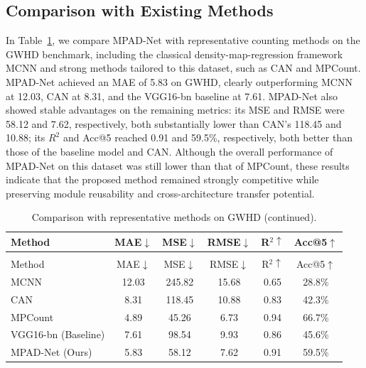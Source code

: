 \documentclass[a4paper,fleqn]{cas-sc}
\begin{document}
	\FloatBarrier
	
	\subsection{Comparison with Existing Methods}
	
	In Table~\ref{tab:sota_gwhd}, we compare MPAD-Net with representative counting methods on the GWHD benchmark, including the classical density-map-regression framework MCNN and strong methods tailored to this dataset, such as CAN and MPCount. MPAD-Net achieved an MAE of 5.83 on GWHD, clearly outperforming MCNN at 12.03, CAN at 8.31, and the VGG16-bn baseline at 7.61. MPAD-Net also showed stable advantages on the remaining metrics: its MSE and RMSE were 58.12 and 7.62, respectively, both substantially lower than CAN's 118.45 and 10.88; its $R^2$ and Acc@5 reached 0.91 and 59.5\%, respectively, both better than those of the baseline model and CAN. Although the overall performance of MPAD-Net on this dataset was still lower than that of MPCount, these results indicate that the proposed method remained strongly competitive while preserving module reusability and cross-architecture transfer potential.
	
	\begin{longtable}{lccccc}
		\caption{Comparison with representative methods on GWHD.}
		\label{tab:sota_gwhd}\\
		\hline
		Method & MAE$\downarrow$ & MSE$\downarrow$ & RMSE$\downarrow$ & R$^2\uparrow$ & Acc@5$\uparrow$ \\
		\hline
		\endfirsthead
		\caption[]{Comparison with representative methods on GWHD (continued).}\\
		\hline
		Method & MAE$\downarrow$ & MSE$\downarrow$ & RMSE$\downarrow$ & R$^2\uparrow$ & Acc@5$\uparrow$ \\
		\hline
		\endhead
		\hline
		\endfoot
		\hline
		\endlastfoot
		MCNN \cite{ref20}      & 12.03 & 245.82 & 15.68 & 0.65 & 28.8\% \\
		CAN \cite{ref23}       & 8.31  & 118.45 & 10.88 & 0.83 & 42.3\% \\
		MPCount \cite{ref58}   & 4.89  & 45.26  & 6.73  & 0.94 & 66.7\% \\
		VGG16-bn (Baseline)    & 7.61  & 98.54  & 9.93  & 0.86 & 45.6\% \\
		MPAD-Net (Ours)        & 5.83  & 58.12  & 7.62  & 0.91 & 59.5\% \\
	\end{longtable}
	
\end{document}
